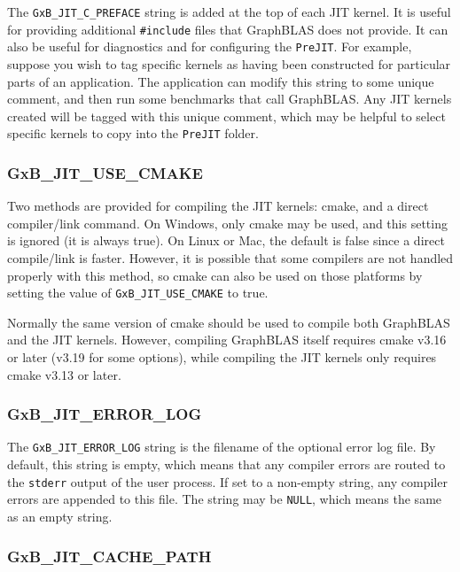 The \verb'GxB_JIT_C_PREFACE' string is added at the top of each JIT kernel.  It
is useful for providing additional \verb'#include' files that GraphBLAS does
not provide.  It can also be useful for diagnostics and for configuring the
\verb'PreJIT'.  For example, suppose you wish to tag specific kernels as having
been constructed for particular parts of an application.  The application can
modify this string to some unique comment, and then run some benchmarks that
call GraphBLAS.  Any JIT kernels created will be tagged with this unique
comment, which may be helpful to select specific kernels to copy into the
\verb'PreJIT' folder.

\subsubsection{\sf GxB\_JIT\_USE\_CMAKE}
\label{use_cmake}

Two methods are provided for compiling the JIT kernels: cmake, and a direct
compiler/link command.  On Windows, only cmake may be used, and this setting
is ignored (it is always true).  On Linux or Mac, the default is false since
a direct compile/link is faster.  However, it is possible that some compilers
are not handled properly with this method, so cmake can also be used on those
platforms by setting the value of \verb'GxB_JIT_USE_CMAKE' to true.

Normally the same version of cmake should be used to compile both GraphBLAS and
the JIT kernels.  However, compiling GraphBLAS itself requires cmake v3.16 or
later (v3.19 for some options), while compiling the JIT kernels only requires
cmake v3.13 or later.

\subsubsection{\sf GxB\_JIT\_ERROR\_LOG}

The \verb'GxB_JIT_ERROR_LOG' string is the filename of the optional error
log file.  By default, this string is empty, which means that any compiler
errors are routed to the \verb'stderr' output of the user process.  If set
to a non-empty string, any compiler errors are appended to this file.
The string may be \verb'NULL', which means the same as an empty string.

\subsubsection{\sf GxB\_JIT\_CACHE\_PATH}
\label{cache_path}

